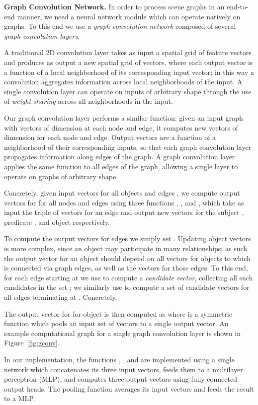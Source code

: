 \documentclass[10pt,twocolumn,letterpaper]{article}
\begin{document}
\textbf{Graph Convolution Network.}
In order to process scene graphs in an end-to-end manner, we need a neural
network module which can operate natively on graphs. To this end we use a
\emph{graph convolution network} composed of several \emph{graph convolution
layers}.

A traditional 2D convolution layer takes as input a spatial grid of feature vectors
and produces as output a new spatial grid of vectors, where each output vector is a
function of a local neighborhood of its corresponding input vector; in this way a
convolution aggregates information across local neighborhoods of the input. A single
convolution layer can operate on inputs of arbitrary shape through the use of
\emph{weight sharing} across all neighborhoods in the input.

Our graph convolution layer performs a similar function: given an input graph with
vectors of dimension  at each node and edge, it computes new vectors of
dimension  for each node and edge. Output vectors are a function of a
neighborhood of their corresponding inputs, so that each graph convolution layer
propagates information along edges of the graph. A graph convolution layer applies
the same function to all edges of the graph, allowing a single layer to operate on
graphs of arbitrary shape.

Concretely, given input vectors  for all objects  and
edges , we compute output vectors for 
for all nodes and edges using three functions , , and , which
take as input the triple of vectors  for an edge and output new vectors
for the subject , predicate , and object  respectively.

To compute the output vectors  for edges we simply set .
Updating object vectors is more complex, since an object may participate in
many relationships; as such the output vector  for an object  should depend
on all vectors  for objects to which  is connected via graph edges, as well
as the vectors  for those edges. To this end, for each edge starting at 
we use  to compute a \emph{candidate vector}, collecting all such candidates in
the set ; we similarly use  to compute a set of candidate vectors 
for all edges terminating at . Concretely,

The output vector for  for object  is then computed as
 where  is a symmetric function which pools an input set of
vectors to a single output vector. An example computational graph for a single graph
convolution layer is shown in Figure~\ref{fig:gconv}.

In our implementation, the functions , , and  are implemented using
a single network which concatenates its three input vectors, feeds them to a multilayer
perceptron (MLP), and computes three output vectors using fully-connected output heads.
The pooling function  averages its input vectors and feeds the result to a MLP.
\end{document}
